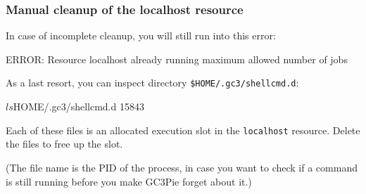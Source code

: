 \documentclass[english,serif,mathserif,xcolor=pdftex,dvipsnames,table]{beamer}
\begin{document}
\begin{frame}[fragile]
  \frametitle{Manual cleanup of the {\ttfamily localhost} resource}

  In case of incomplete cleanup, you will still run into this error:
\begin{stdout}
  ERROR: Resource localhost already running maximum allowed number of jobs
\end{stdout}

  \+
  As a last resort, you can inspect directory \lstinline|$HOME/.gc3/shellcmd.d|:
\begin{stdout}
  $ ls $HOME/.gc3/shellcmd.d
  15843
\end{stdout}
  Each of these files is an allocated execution slot in the \texttt{localhost} resource.
  Delete the files to free up the slot.

  \+ (The file name is the PID of the process, in case you want to
  check if a command is still running before you make GC3Pie forget
  about it.)
\end{frame}
\end{document}
